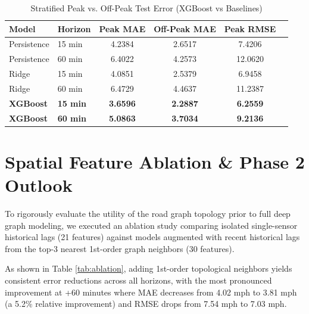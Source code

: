 \documentclass[conference]{IEEEtran}
\begin{document}
\begin{table}[t]
\caption{Stratified Peak vs. Off-Peak Test Error (XGBoost vs Baselines)}
\label{tab:metrics_peak}
\centering
\begin{tabular}{llcccc}
\toprule
\textbf{Model} & \textbf{Horizon} & \textbf{Peak MAE} & \textbf{Off-Peak MAE} & \textbf{Peak RMSE} \\
\midrule
Persistence & 15 min & 4.2384 & 2.6517 & 7.4206 \\
Persistence & 60 min & 6.4022 & 4.2573 & 12.0620 \\
\midrule
Ridge       & 15 min & 4.0851 & 2.5379 & 6.9458 \\
Ridge       & 60 min & 6.4729 & 4.4637 & 11.2387 \\
\midrule
\textbf{XGBoost} & \textbf{15 min} & \textbf{3.6596} & \textbf{2.2887} & \textbf{6.2559} \\
\textbf{XGBoost} & \textbf{60 min} & \textbf{5.0863} & \textbf{3.7034} & \textbf{9.2136} \\
\bottomrule
\end{tabular}
\end{table}

\section{Spatial Feature Ablation \& Phase 2 Outlook}
To rigorously evaluate the utility of the road graph topology prior to full deep graph modeling, we executed an ablation study comparing isolated single-sensor historical lags (21 features) against models augmented with recent historical lags from the top-3 nearest 1st-order graph neighbors (30 features). 

As shown in Table \ref{tab:ablation}, adding 1st-order topological neighbors yields consistent error reductions across all horizons, with the most pronounced improvement at +60 minutes where MAE decreases from 4.02 mph to 3.81 mph (a 5.2\% relative improvement) and RMSE drops from 7.54 mph to 7.03 mph.
\end{document}
